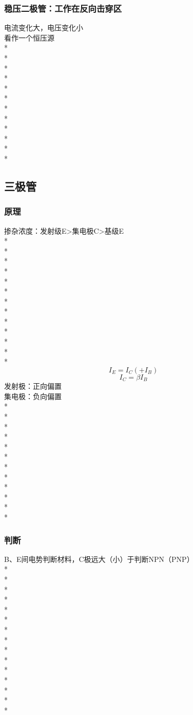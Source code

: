 \documentclass[UTF8, fontset=none]{ctexart}
\begin{document}
\begin{multicols*}{8}
\subsubsection{稳压二极管：工作在反向击穿区}
电流变化大，电压变化小\\%
看作一个恒压源\\
*\\
*\\
*\\
*\\
*\\
*\\
*\\
*\\
*\\
*\\
*\\
*
\subsection{三极管}
\subsubsection{原理}
掺杂浓度：发射级E>集电极C>基级E\\%
*\\
*\\
*\\
*\\
*\\
*\\
*\\
*\\
*\\
*\\
*\\
*\\
*
\[I_E =I_C (+ I_B)\]
\[I_C = \beta I_B\]
发射极：正向偏置\\
集电极：负向偏置\\
*\\
*\\
*\\
*\\
*\\
*\\
*\\
*\\
*\\
*\\
*\\
*
\subsubsection{判断}
B、E间电势判断材料，C极远大（小）于判断NPN（PNP）\\%
*\\
*\\
*\\
*\\
*\\
*\\
*\\
*\\
*\\
*\\
*\\
*\\
*\\
*\\
*

\end{multicols*}
\end{document}
